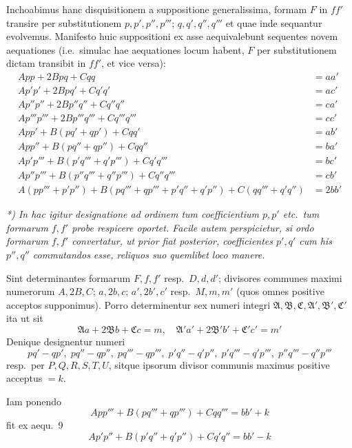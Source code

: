 \documentclass[12pt,a4paper]{article}
\theoremstyle{plain}
\theoremstyle{definition}
\theoremstyle{remark}
\theoremstyle{problemstyle}
\begin{document}
Inchoabimus hanc disquisitionem a suppositione generalissima, formam $F$ in $ff'$ transire per substitutionem $p, p', p'', p'''$; $q, q', q'', q'''$ et quae inde sequantur evolvemus. Manifesto huic suppositioni ex asse aequivalebunt sequentes novem aequationes (i.e.\ simulac hae aequationes locum habent, $F$ per substitutionem dictam transibit in $ff'$, et vice versa):
\begin{align}
App + 2Bpq + Cqq &= aa' \tag{1} \\
Ap'p' + 2Bpq' + Cq'q' &= ac' \tag{2} \\
Ap''p'' + 2Bp''q'' + Cq''q'' &= ca' \tag{3} \\
Ap'''p''' + 2Bp'''q''' + Cq'''q''' &= cc' \tag{4} \\
App' + B(pq' + qp') + Cqq' &= ab' \tag{5} \\
App'' + B(pq'' + qp'') + Cqq'' &= ba' \tag{6} \\
Ap'p''' + B(p'q''' + q'p''') + Cq'q''' &= bc' \tag{7} \\
Ap''p''' + B(p''q''' + q''p''') + Cq''q''' &= cb' \tag{8} \\
A(pp''' + p'p'') + B(pq''' + qp''' + p'q'' + q'p'') + C(qq''' + q'q'') &= 2bb' \tag{9}
\end{align}

\emph{*) In hac igitur designatione ad ordinem tum coefficientium $p, p'$ etc.\ tum formarum $f, f'$ probe respicere oportet. Facile autem perspicietur, si ordo formarum $f, f'$ convertatur, ut prior fiat posterior, coefficientes $p', q'$ cum his $p'', q''$ commutandos esse, reliquos suo quemlibet loco manere.}

Sint determinantes formarum $F, f, f'$ resp.\ $D, d, d'$; divisores communes maximi numerorum $A, 2B, C$; $a, 2b, c$; $a', 2b', c'$ resp.\ $M, m, m'$ (quos omnes positive acceptos supponimus). Porro determinentur sex numeri integri $\mathfrak{A}, \mathfrak{B}, \mathfrak{C}, \mathfrak{A}', \mathfrak{B}', \mathfrak{C}'$ ita ut sit
\[
\mathfrak{A}a + 2\mathfrak{B}b + \mathfrak{C}c = m, \quad \mathfrak{A}'a' + 2\mathfrak{B}'b' + \mathfrak{C}'c' = m'
\]
Denique designentur numeri
\[
pq' - qp', \; pq'' - qp'', \; pq''' - qp''', \; p'q'' - q'p'', \; p'q''' - q'p''', \; p''q''' - q''p'''
\]
resp.\ per $P, Q, R, S, T, U$, sitque ipsorum divisor communis maximus positive acceptus $= k$.

Iam ponendo
\begin{equation}
App''' + B(pq''' + qp''') + Cqq''' = bb' + k \tag{10}
\end{equation}
fit ex aequ.\ 9
\begin{equation}
Ap'p'' + B(p'q'' + q'p'') + Cq'q'' = bb' - k \tag{11}
\end{equation}
\end{document}
